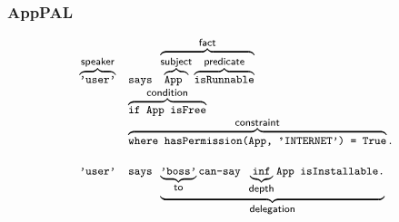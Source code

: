 \documentclass{beamer}
\begin{document}
\begin{frame}[fragile]
  \frametitle{AppPAL}
  \newcommand{\mybracetext}[1]{\text{\sffamily\footnotesize #1}}
  \newcommand{\mysmalltext}[1]{\text{\ttfamily\small #1}}
  
  \begin{center}
    \begin{equation*}
      \begin{array}{r l}
        \overbrace{\mysmalltext{'user'}}^{\mybracetext{speaker}}
        & \mysmalltext{ says }\overbrace{\overbrace{\mysmalltext{ App }}^{\mybracetext{subject}}\overbrace{\mysmalltext{ isRunnable}}^{\mybracetext{predicate}}}^{\mybracetext{fact}} \\
        & \overbrace{\mysmalltext{ if App isFree}}^{\mybracetext{condition}} \\
        & \overbrace{\mysmalltext{ where hasPermission(App, 'INTERNET') = True}}^{\mybracetext{constraint}}. \\
        \\        
        \mysmalltext{'user'}  
        & \mysmalltext{ says }\underbrace{\underbrace{\mysmalltext{'boss'}}_{\mybracetext{to}}\mysmalltext{ can-say }\underbrace{\mysmalltext{inf}}_{\mybracetext{depth}}\mysmalltext{App isInstallable.}}_{\mybracetext{delegation}}
      \end{array}
    \end{equation*}
  \end{center}
  

\end{frame}
\end{document}

